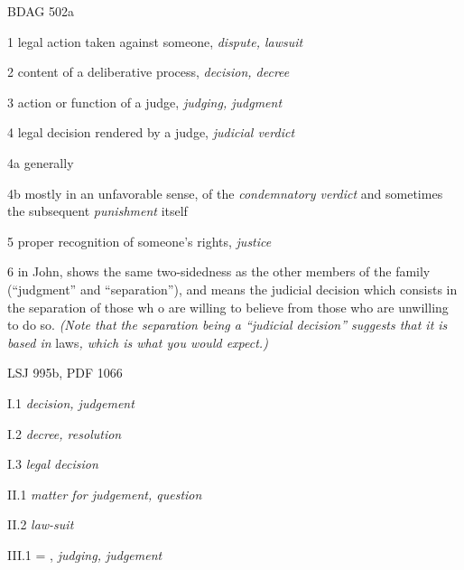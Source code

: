 				\begin{compactdesc}
					\item[BDAG 502a] \textbf{}
						\begin{compactitem}
							\item[1] legal action taken against someone, \textit{dispute, lawsuit}
							\item[2] content of a deliberative process, \textit{decision, decree}
							\item[3] action or function of a judge, \textit{judging, judgment}
							\item[4] legal decision rendered by a judge, \textit{judicial verdict}
							\item[4a] generally
							\item[4b] mostly in an unfavorable sense, of the \textit{condemnatory verdict} and sometimes the subsequent \textit{punishment} itself
							\item[5] proper recognition of someone's rights, \textit{justice}
							\item[6] in John,  shows the same two-sidedness as the other members of the  family (``judgment'' and ``separation''), and means the judicial decision which consists in the separation of those wh	o are willing to believe from those who are unwilling to do so. \textit{(Note that the separation being a ``judicial decision'' suggests that it is based in} laws\textit{, which is what you would expect.)}
						\end{compactitem}
					\item[LSJ 995b, PDF 1066] \textbf{}
						\begin{compactitem}
							\item[I.1] \textit{decision, judgement}
							\item[I.2] \textit{decree, resolution}
							\item[I.3] \textit{legal decision}
							\item[II.1] \textit{matter for judgement, question}
							\item[II.2] \textit{law-suit}
							\item[III.1] = , \textit{judging, judgement}
						\end{compactitem}
				\end{compactdesc}
				
